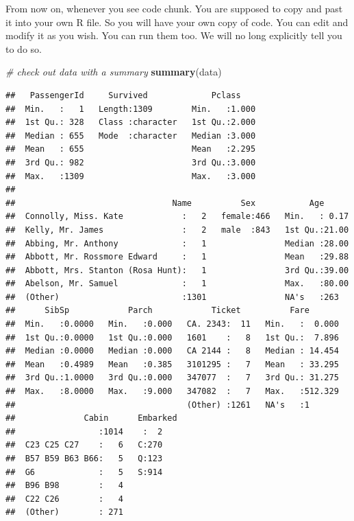 \documentclass[
]{book}
\makeatletter
\newenvironment{Shaded}{\begin{snugshade}}{\end{snugshade}}
\newcommand{\CommentTok}[1]{\textcolor[rgb]{0.56,0.35,0.01}{\textit{#1}}}
\newcommand{\KeywordTok}[1]{\textcolor[rgb]{0.13,0.29,0.53}{\textbf{#1}}}
\newcommand{\NormalTok}[1]{#1}
\newenvironment{kframe}{%
\medskip{}
\setlength{\fboxsep}{.8em}
 \def\at@end@of@kframe{}%
 \ifinner\ifhmode%
  \def\at@end@of@kframe{\end{minipage}}%
  \begin{minipage}{\columnwidth}%
 \fi\fi%
 \def\FrameCommand##1{\hskip\@totalleftmargin \hskip-\fboxsep
 \colorbox{shadecolor}{##1}\hskip-\fboxsep
     \hskip-\linewidth \hskip-\@totalleftmargin \hskip\columnwidth}%
 \MakeFramed {\advance\hsize-\width
   \@totalleftmargin\z@ \linewidth\hsize
   \@setminipage}}%
 {\par\unskip\endMakeFramed%
 \at@end@of@kframe}
\newenvironment{rmdblock}[1]
  {
  \begin{itemize}
  \renewcommand{\labelitemi}{
    \raisebox{-.7\height}[0pt][0pt]{
      {\setkeys{Gin}{width=3em,keepaspectratio}\texttt{[image: images/\#1]}}
    }
  }
  \setlength{\fboxsep}{1em}
  \begin{kframe}
  \item
  }
  {
  \end{kframe}
  \end{itemize}
  }
\newenvironment{rmdnote}
  {\begin{rmdblock}{note}}
  {\end{rmdblock}}
\makeatother
\begin{document}
\begin{rmdnote}
From now on, whenever you see code chunk. You are supposed to copy and past it into your own R file. So you will have your own copy of code. You can edit and modify it as you wish. You can run them too. We will no long explicitly tell you to do so.
\end{rmdnote}

\begin{Shaded}
\begin{Highlighting}[]
\CommentTok{# check out data with a summary}
\KeywordTok{summary}\NormalTok{(data)}
\end{Highlighting}
\end{Shaded}

\begin{verbatim}
##   PassengerId     Survived             Pclass     
##  Min.   :   1   Length:1309        Min.   :1.000  
##  1st Qu.: 328   Class :character   1st Qu.:2.000  
##  Median : 655   Mode  :character   Median :3.000  
##  Mean   : 655                      Mean   :2.295  
##  3rd Qu.: 982                      3rd Qu.:3.000  
##  Max.   :1309                      Max.   :3.000  
##                                                   
##                                Name          Sex           Age       
##  Connolly, Miss. Kate            :   2   female:466   Min.   : 0.17  
##  Kelly, Mr. James                :   2   male  :843   1st Qu.:21.00  
##  Abbing, Mr. Anthony             :   1                Median :28.00  
##  Abbott, Mr. Rossmore Edward     :   1                Mean   :29.88  
##  Abbott, Mrs. Stanton (Rosa Hunt):   1                3rd Qu.:39.00  
##  Abelson, Mr. Samuel             :   1                Max.   :80.00  
##  (Other)                         :1301                NA's   :263    
##      SibSp            Parch            Ticket          Fare        
##  Min.   :0.0000   Min.   :0.000   CA. 2343:  11   Min.   :  0.000  
##  1st Qu.:0.0000   1st Qu.:0.000   1601    :   8   1st Qu.:  7.896  
##  Median :0.0000   Median :0.000   CA 2144 :   8   Median : 14.454  
##  Mean   :0.4989   Mean   :0.385   3101295 :   7   Mean   : 33.295  
##  3rd Qu.:1.0000   3rd Qu.:0.000   347077  :   7   3rd Qu.: 31.275  
##  Max.   :8.0000   Max.   :9.000   347082  :   7   Max.   :512.329  
##                                   (Other) :1261   NA's   :1        
##              Cabin      Embarked
##                 :1014    :  2   
##  C23 C25 C27    :   6   C:270   
##  B57 B59 B63 B66:   5   Q:123   
##  G6             :   5   S:914   
##  B96 B98        :   4           
##  C22 C26        :   4           
##  (Other)        : 271
\end{verbatim}
\end{document}
